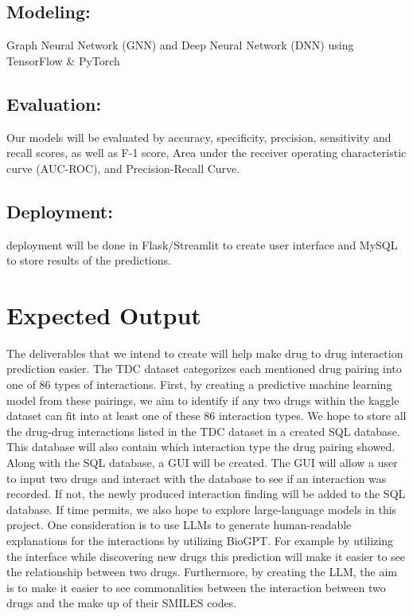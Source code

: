 \documentclass{report}
\begin{document}
\section{Modeling:}
Graph Neural Network (GNN) and Deep Neural Network (DNN) using TensorFlow \& PyTorch
\section{Evaluation:}
Our models will be evaluated by accuracy, specificity, precision, sensitivity and recall scores, as well as F-1 score, Area under the receiver operating characteristic curve (AUC-ROC), and Precision-Recall Curve.
\section{Deployment:}
deployment will be done in Flask/Streamlit to create user interface and MySQL to store results of the predictions.

\chapter{Expected Output}

The deliverables that we intend to create will help make drug to drug interaction prediction easier. The TDC dataset categorizes each mentioned drug pairing into one of 86 types of interactions. First, by creating a predictive machine learning model from these pairings, we aim to identify if any two drugs within the kaggle dataset can fit into at least one of these 86 interaction types.
We hope to store all the drug-drug interactions listed in the TDC dataset in a created SQL database. This database will also contain which interaction type the drug pairing showed. Along with the SQL database, a GUI will be created. The GUI will allow a user to input two drugs and interact with the database to see if an interaction was recorded. If not, the newly produced interaction finding will be added to the SQL database. 
If time permits, we also hope to explore large-language models in this project. One consideration is to use LLMs to generate human-readable explanations for the interactions by utilizing BioGPT. 
For example by utilizing the interface while discovering new drugs this prediction will make it easier to see the relationship between two drugs. Furthermore, by creating the LLM, the aim is to make it easier to see commonalities between the interaction between two drugs and the make up of their SMILES codes. 
\end{document}
